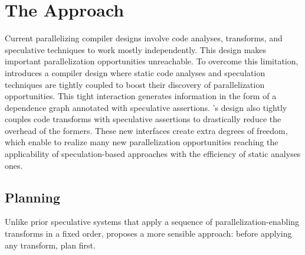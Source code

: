\section{The \name Approach}
\label{sec:approach}

Current parallelizing compiler designs involve code analyses, transforms,
and speculative techniques to work mostly independently.  This design makes
important parallelization opportunities unreachable.  To overcome this
limitation, \name introduces a compiler design where static code analyses
and speculation techniques are tightly coupled to boost their discovery of
parallelization opportunities.  This tight interaction generates
information in the form of a dependence graph annotated with speculative
assertions.  \namensp's design also tightly couples code transforms with
speculative assertions to drastically reduce the overhead of the formers.
These new interfaces create extra degrees of freedom, which enable \name to
realize many new parallelization opportunities reaching the applicability
of speculation-based approaches with the efficiency of static analyses
ones.


\subsection{Planning}
\label{planning}
%
Unlike prior speculative systems that apply a sequence of
parallelization-enabling transforms in a fixed order, \name proposes a
more sensible approach: before applying any transform, plan
first.

